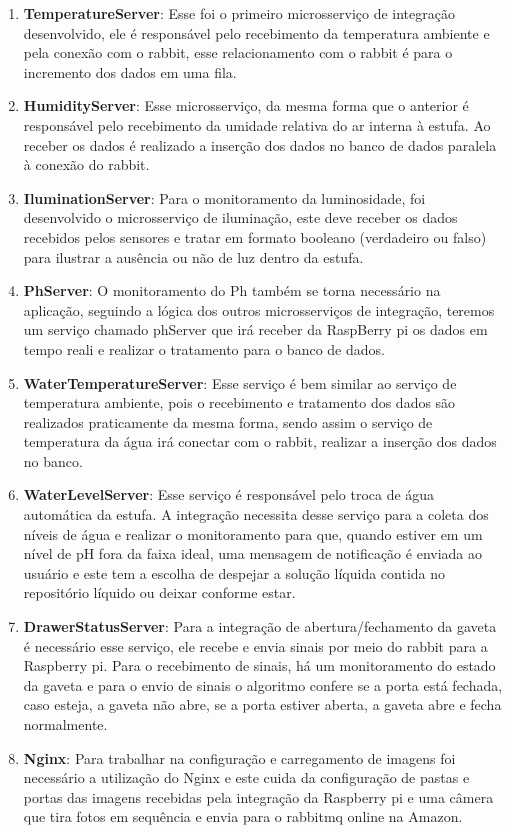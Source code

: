 \begin{enumerate}
	\item \textbf{TemperatureServer}: Esse foi o primeiro microsserviço de integração desenvolvido, ele é responsável pelo recebimento da temperatura ambiente e pela conexão com o rabbit, esse relacionamento com o rabbit é para o incremento dos dados em uma fila.
	\item \textbf{HumidityServer}: Esse microsserviço, da mesma forma que o anterior é responsável pelo recebimento da umidade relativa do ar interna à estufa. Ao receber os dados é realizado a inserção dos dados no banco de dados paralela à conexão do rabbit.
	\item \textbf{IluminationServer}: Para o monitoramento da luminosidade, foi desenvolvido o microsserviço de iluminação, este deve receber os dados recebidos pelos sensores e tratar em formato booleano (verdadeiro ou falso) para ilustrar a ausência ou não de luz dentro da estufa. 
	\item \textbf{PhServer}: O monitoramento do Ph também se torna necessário na aplicação, seguindo a lógica dos outros microsserviços de integração, teremos um serviço chamado phServer que irá receber da RaspBerry pi os dados em tempo reali e realizar o tratamento para o banco de dados.
	\item \textbf{WaterTemperatureServer}:  Esse serviço é bem similar ao serviço de temperatura ambiente, pois o recebimento e tratamento dos dados são realizados praticamente da mesma forma, sendo assim o serviço de temperatura da água irá conectar com o rabbit, realizar a inserção dos dados no banco.
	\item \textbf{WaterLevelServer}: Esse serviço é responsável pelo troca de água automática da estufa. A integração necessita desse serviço para a coleta dos níveis de água e realizar o monitoramento para que, quando estiver em um nível de pH fora da faixa ideal, uma mensagem de notificação é enviada ao usuário e este tem a escolha de despejar a solução líquida contida no repositório líquido ou deixar conforme estar.
	\item \textbf{DrawerStatusServer}: Para a integração de abertura/fechamento da gaveta é necessário esse serviço, ele recebe e envia sinais por meio do rabbit para a Raspberry pi. Para o recebimento de sinais, há um monitoramento do estado da gaveta e para o envio de sinais o algoritmo confere se a porta está fechada, caso esteja, a gaveta não abre, se a porta estiver aberta, a gaveta abre e fecha normalmente.
	\item \textbf{Nginx}: Para trabalhar na configuração e carregamento de imagens foi necessário a utilização do Nginx e este cuida da configuração de pastas e portas das imagens recebidas pela integração da Raspberry pi e uma câmera que tira fotos em sequência e envia para o rabbitmq online na Amazon.
\end{enumerate}

